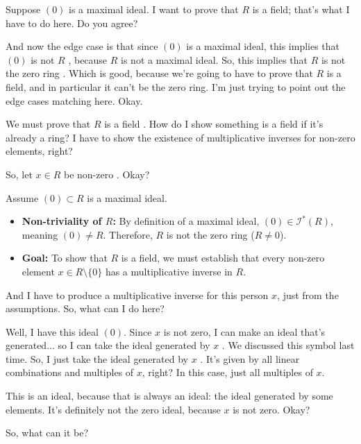 \begin{speech}[00:16:51 - 00:18:05]
Suppose $(0)$ is a maximal ideal. I want to prove that $R$ is a field; that's what I have to do here. Do you agree?

And now the edge case is that since $(0)$ is a maximal ideal, this implies that $(0)$ is not $R$ , because $R$ is not a maximal ideal. So, this implies that $R$ is not the zero ring . Which is good, because we're going to have to prove that $R$ is a field, and in particular it can't be the zero ring. I'm just trying to point out the edge cases matching here. Okay.

We must prove that $R$ is a field . How do I show something is a field if it's already a ring? I have to show the existence of multiplicative inverses for non-zero elements, right?

So, let $x \in R$ be non-zero . Okay?
\end{speech}

\begin{content}
Assume $(0) \subset R$ is a maximal ideal.
\begin{itemize}
    \item \textbf{Non-triviality of $R$:} By definition of a maximal ideal, $(0) \in \mathscr{I}^*(R)$, meaning $(0) \neq R$. Therefore, $R$ is not the zero ring ($R \neq 0$).
    \item \textbf{Goal:} To show that $R$ is a field, we must establish that every non-zero element $x \in R \setminus \{0\}$ has a multiplicative inverse in $R$.
\end{itemize}
\end{content}

\begin{speech}[00:18:05 - 00:18:56]
And I have to produce a multiplicative inverse for this person $x$, just from the assumptions. So, what can I do here?

Well, I have this ideal $(0)$. Since $x$ is not zero, I can make an ideal that's generated... so I can take the ideal generated by $x$ . We discussed this symbol last time. So, I just take the ideal generated by $x$ . It's given by all linear combinations and multiples of $x$, right? In this case, just all multiples of $x$.

This is an ideal, because that is always an ideal: the ideal generated by some elements. It's definitely not the zero ideal, because $x$ is not zero. Okay?

So, what can it be?
\end{speech}

